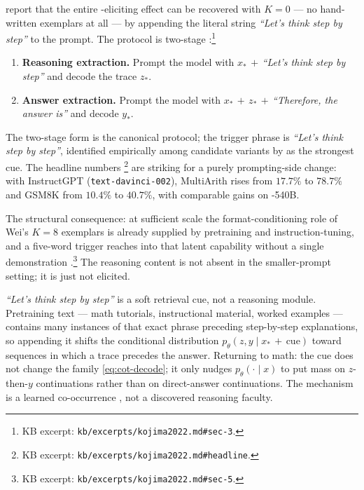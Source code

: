 \citet{kojima2022} report that the entire -eliciting effect can be
recovered with $K = 0$ — no hand-written exemplars at all — by
appending the literal string \emph{``Let's think step by step''} to the
prompt. The protocol is two-stage
\citep[\S 3]{kojima2022}:\footnote{KB excerpt:
\nolinkurl{kb/excerpts/kojima2022.md#sec-3}.}
\begin{enumerate}
\item \textbf{Reasoning extraction.} Prompt the model with
$x_* \,+\,$\emph{``Let's think step by step''} and decode the trace
$z_*$.
\item \textbf{Answer extraction.} Prompt the model with
$x_* \,+\, z_* \,+\,$\emph{``Therefore, the answer is''} and decode
$y_*$.
\end{enumerate}
The two-stage form is the canonical protocol; the trigger phrase is
\emph{``Let's think step by step''}, identified empirically among
candidate variants by \citet{kojima2022} as the strongest cue. The
headline numbers \citep[headline]{kojima2022}\footnote{KB excerpt:
\nolinkurl{kb/excerpts/kojima2022.md#headline}.} are striking for a
purely prompting-side change: with InstructGPT (\texttt{text-davinci-002}),
MultiArith rises from $17.7\%$ to $78.7\%$ and GSM8K from $10.4\%$ to
$40.7\%$, with comparable gains on -540B.

The structural consequence: at sufficient scale the format-conditioning
role of Wei's $K = 8$ exemplars is already supplied by pretraining and
instruction-tuning, and a five-word trigger reaches into that latent
capability without a single demonstration
\citep[\S 5]{kojima2022}.\footnote{KB excerpt:
\nolinkurl{kb/excerpts/kojima2022.md#sec-5}.} The reasoning content is
not absent in the smaller-prompt setting; it is just not elicited.

\begin{intuition}
\emph{``Let's think step by step''} is a soft retrieval cue, not a
reasoning module. Pretraining text — math tutorials, instructional
material, worked examples — contains many instances of that exact
phrase preceding step-by-step explanations, so appending it shifts
the conditional distribution $p_\theta(z, y \mid x_* \,+\, \text{cue})$
toward sequences in which a trace precedes the answer. Returning to
math: the cue does not change the family
\cref{eq:cot-decode}; it only nudges $p_\theta(\cdot \mid x)$ to put
mass on $z$-then-$y$ continuations rather than on direct-answer
continuations. The mechanism is a learned co-occurrence
\citep[\S 5]{kojima2022}, not a discovered reasoning faculty.
\end{intuition}

